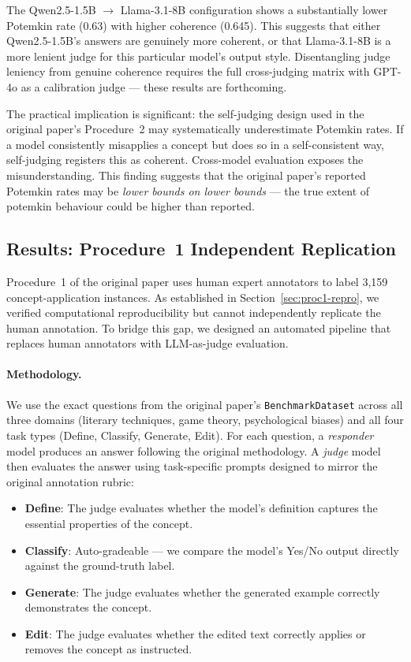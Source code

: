 \documentclass[sigconf,authordraft]{acmart}
\begin{document}
The Qwen2.5-1.5B $\to$ Llama-3.1-8B configuration shows a substantially lower Potemkin rate (0.63) with higher coherence (0.645). This suggests that either Qwen2.5-1.5B's answers are genuinely more coherent, or that Llama-3.1-8B is a more lenient judge for this particular model's output style. Disentangling judge leniency from genuine coherence requires the full cross-judging matrix with GPT-4o as a calibration judge --- these results are forthcoming.

The practical implication is significant: the self-judging design used in the original paper's Procedure~2 may systematically underestimate Potemkin rates. If a model consistently misapplies a concept but does so in a self-consistent way, self-judging registers this as coherent. Cross-model evaluation exposes the misunderstanding. This finding suggests that the original paper's reported Potemkin rates may be \emph{lower bounds on lower bounds} --- the true extent of potemkin behaviour could be higher than reported.

\subsection{Results: Procedure~1 Independent Replication}
\label{sec:proc1-replication}

Procedure~1 of the original paper uses human expert annotators to label 3,159 concept-application instances. As established in Section~\ref{sec:proc1-repro}, we verified computational reproducibility but cannot independently replicate the human annotation. To bridge this gap, we designed an automated pipeline that replaces human annotators with LLM-as-judge evaluation.

\paragraph{Methodology.} We use the exact questions from the original paper's \texttt{BenchmarkDataset} across all three domains (literary techniques, game theory, psychological biases) and all four task types (Define, Classify, Generate, Edit). For each question, a \emph{responder} model produces an answer following the original methodology. A \emph{judge} model then evaluates the answer using task-specific prompts designed to mirror the original annotation rubric:

\begin{itemize}
    \item \textbf{Define}: The judge evaluates whether the model's definition captures the essential properties of the concept.
    \item \textbf{Classify}: Auto-gradeable --- we compare the model's Yes/No output directly against the ground-truth label.
    \item \textbf{Generate}: The judge evaluates whether the generated example correctly demonstrates the concept.
    \item \textbf{Edit}: The judge evaluates whether the edited text correctly applies or removes the concept as instructed.
\end{itemize}
\end{document}
